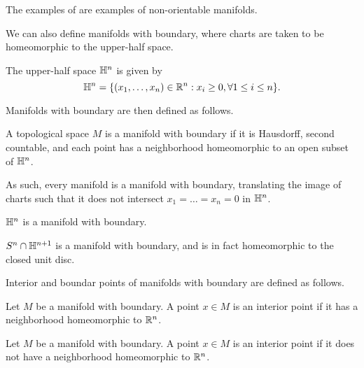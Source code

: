 \begin{remark}
    The examples of  are examples of non-orientable manifolds. 
\end{remark}
We can also define manifolds with boundary, where charts are taken to be homeomorphic to the upper-half space. 
\begin{definition}\label{def: upper-half space}
    The upper-half space $\mathbb{H}^{n}$ is given by 
    $$\mathbb{H}^{n}=\{(x_{1},\dots,x_{n})\in\mathbb{R}^{n}:x_{i}\geq0, \forall 1\leq i\leq n\}.$$
\end{definition}
Manifolds with boundary are then defined as follows. 
\begin{definition}\label{def: manifold with boundary}
    A topological space $M$ is a manifold with boundary if it is Hausdorff, second countable, and each point has a neighborhood homeomorphic to an open subset of $\mathbb{H}^{n}$. 
\end{definition}
\begin{remark}
    As such, every manifold is a manifold with boundary, translating the image of charts such that it does not intersect $x_{1}=\dots=x_{n}=0$ in $\mathbb{H}^{n}$. 
\end{remark}
\begin{example}
    $\mathbb{H}^{n}$ is a manifold with boundary. 
\end{example}
\begin{example}
    $S^{n}\cap\mathbb{H}^{n+1}$ is a manifold with boundary, and is in fact homeomorphic to the closed unit disc. 
\end{example}
Interior and boundar points of manifolds with boundary are defined as follows. 
\begin{definition}\label{def: interior point}
    Let $M$ be a manifold with boundary. A point $x\in M$ is an interior point if it has a neighborhood homeomorphic to $\mathbb{R}^{n}$. 
\end{definition}
\begin{definition}\label{def: boundary point}
    Let $M$ be a manifold with boundary. A point $x\in M$ is an interior point if it does not have a neighborhood homeomorphic to $\mathbb{R}^{n}$. 
\end{definition}